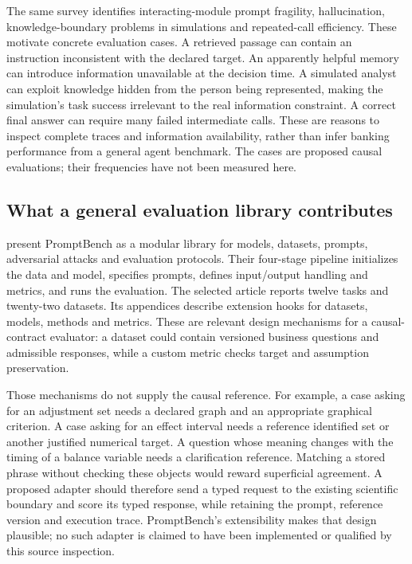 The same survey identifies interacting-module prompt fragility,
hallucination, knowledge-boundary problems in simulations and repeated-call
efficiency. These motivate concrete evaluation cases. A retrieved passage
can contain an instruction inconsistent with the declared target. An
apparently helpful memory can introduce information unavailable at the
decision time. A simulated analyst can exploit knowledge hidden from the
person being represented, making the simulation's task success irrelevant
to the real information constraint. A correct final answer can require many
failed intermediate calls. These are reasons to inspect complete traces and
information availability, rather than infer banking performance from a
general agent benchmark. The cases are proposed causal evaluations;
their frequencies have not been measured here.
\citep{exec18_framework_agents_survey}

\subsection{What a general evaluation library contributes}

\citet{exec18_framework_promptbench} present PromptBench as a modular library
for models, datasets, prompts, adversarial attacks and evaluation protocols.
Their four-stage pipeline initializes the data and model, specifies prompts,
defines input/output handling and metrics, and runs the evaluation. The
selected article reports twelve tasks and twenty-two datasets. Its appendices
describe extension hooks for datasets, models, methods and metrics. These
are relevant design mechanisms for a causal-contract evaluator: a dataset
could contain versioned business questions and admissible responses, while
a custom metric checks target and assumption preservation.

Those mechanisms do not supply the causal reference. For example, a case
asking for an adjustment set needs a declared graph and an appropriate
graphical criterion. A case asking for an effect interval needs a reference
identified set or another justified numerical target. A question whose
meaning changes with the timing of a balance variable needs a clarification
reference. Matching a stored phrase without checking these objects would
reward superficial agreement. A proposed adapter should therefore send a
typed request to the existing scientific boundary and score its typed
response, while retaining the prompt, reference version and execution
trace. PromptBench's extensibility makes that design plausible; no such
adapter is claimed to have been implemented or qualified by this source
inspection. \citep{exec18_framework_promptbench}

